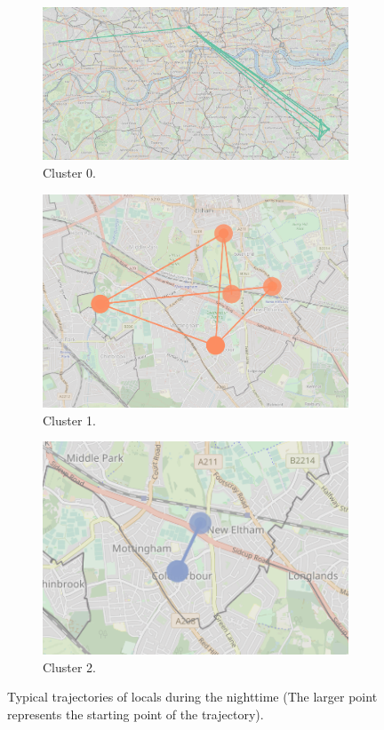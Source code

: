 \documentclass{article}
\theoremstyle{definition}
\theoremstyle{remark}
\begin{document}
\begin{figure}[!h]

\centering
\begin{subfigure}{0.6\textheight}
\centering
\includegraphics[width=0.4\linewidth]{figures/nighttime_locals_c0.png}
\caption{Cluster 0.}
\label{fig:nighttime_locals_c0}
\end{subfigure}
\begin{subfigure}{0.6\textheight}
\centering
\includegraphics[width=0.4\linewidth]{figures/nighttime_locals_c1.png}
\caption{Cluster 1.}
\label{fig:nighttime_locals_c1}
\end{subfigure}
\begin{subfigure}{0.6\textheight}
\centering
\includegraphics[width=0.4\linewidth]{figures/nighttime_locals_c2.png}
\caption{Cluster 2.}
\label{fig:nighttime_locals_c2}
\end{subfigure}

\caption{Typical trajectories of locals during the nighttime (The larger point represents the starting point of the trajectory).}
\label{fig:sequences_nighttime_locals}
\end{figure}
\end{document}
